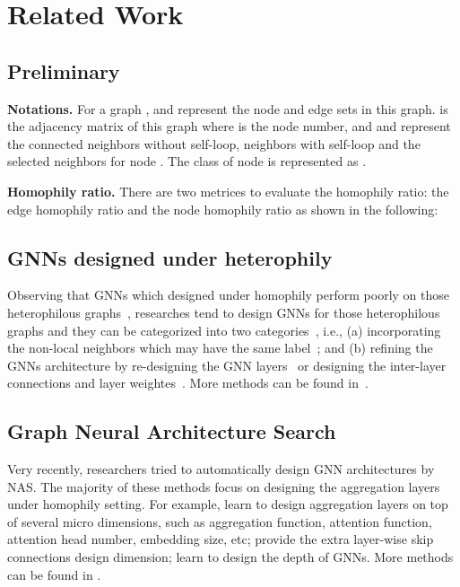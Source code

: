 \documentclass[sigconf]{acmart}
\begin{document}
\section{Related Work}
\subsection{Preliminary}
\label{sec-preliminary}
\noindent\textbf{Notations.} 
For a graph ,   and  represent the node and edge sets in this graph.  is the adjacency matrix of this graph where  is the node number, and  and  represent the connected neighbors without self-loop, neighbors with self-loop and the selected neighbors for node . The class of node  is represented as .


\noindent\textbf{Homophily ratio.} There are two metrices to evaluate the homophily ratio: the edge homophily ratio  and the node homophily ratio  as shown in the following:


\subsection{GNNs designed under heterophily}
Observing that GNNs which designed under homophily perform poorly on those heterophilous graphs~\cite{pei2020geom,zhu2020beyond}, researches tend to design GNNs for those heterophilous graphs and they can be categorized into two categories~\cite{zheng2022graph}, i.e., (a) incorporating the non-local neighbors which may have the same label~\cite{pei2020geom,suresh2021breaking,jin2021universal,wang2022graph}; 
and (b) refining the GNNs architecture by re-designing the GNN layers~\cite{du2022gbk,yan2021two,fang2022polarized,zhu2020beyond} or designing the inter-layer connections and layer weightes~\cite{wei2022designing,zhu2020beyond,chen2020measuring}.  More methods can be found in~\cite{zheng2022graph}.



\subsection{Graph Neural Architecture Search}
Very recently, researchers tried to automatically design GNN architectures by NAS. The majority of these methods focus on designing the aggregation layers under homophily setting.
For example, \cite{gao2019graphnas,zhou2019auto,yoon2020autonomous,li2021one} learn to design aggregation layers on top of several micro dimensions, such as aggregation function, attention function, attention head number, embedding size, etc; \cite{zhao2021search,zhao2020simplifying,li2020autograph,wei2022designing} provide the extra layer-wise skip connections design dimension; \cite{cai2021rethinking,lai2020policy,wang2022graph} learn to design the depth of GNNs. More methods can be found in \cite{zhang2021automated}.
\end{document}
